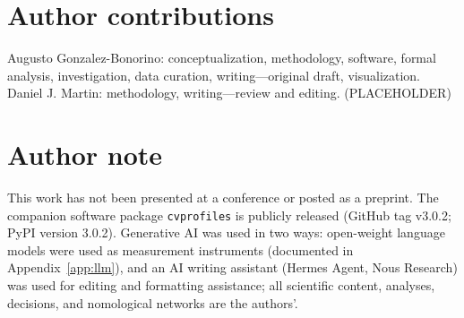 \documentclass[10pt,letterpaper]{article}
\newcommand{\cvp}{\texttt{cvprofiles}}
\begin{document}
\section*{Author contributions}
Augusto Gonzalez-Bonorino: conceptualization, methodology, software, formal analysis, investigation, data curation, writing---original draft, visualization.
Daniel J. Martin: methodology, writing---review and editing. (PLACEHOLDER)

\section*{Author note}
This work has not been presented at a conference or posted as a preprint.
The companion software package \cvp{} is publicly released (GitHub tag v3.0.2; PyPI version 3.0.2).
Generative AI was used in two ways: open-weight language models were used as measurement instruments (documented in Appendix~\ref{app:llm}), and an AI writing assistant (Hermes Agent, Nous Research) was used for editing and formatting assistance; all scientific content, analyses, decisions, and nomological networks are the authors'.
\end{document}
